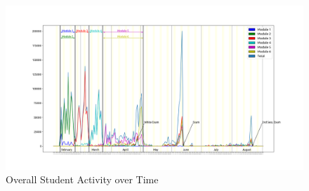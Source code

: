 \documentclass[a4paper,11pt]{report}
\numberwithin{figure}{section} %
\begin{document}
    \begin{figure}[H]
      \centering
      \includegraphics[width=.9\linewidth]{images/timelapse.png}
      \caption{Overall Student Activity over Time}
      \label{fig:timelapse}
    \end{figure}
\end{document}
